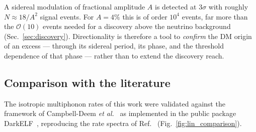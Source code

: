 A sidereal modulation of fractional amplitude $A$ is detected at $3\sigma$ with roughly
$N \approx 18/A^2$ signal events. For $A = 4\%$ this is of order $10^4$ events, far more
than the $\mathcal{O}(10)$ events needed for a discovery above the neutrino background
(Sec.~\ref{sec:discovery}). Directionality is therefore a tool to \emph{confirm} the DM
origin of an excess --- through its sidereal period, its phase, and the threshold
dependence of that phase --- rather than to extend the discovery reach.

\subsection{Comparison with the literature}

The isotropic multiphonon rates of this work were validated against the framework of
Campbell-Deem \emph{et al.}~\cite{CampbellDeem2022} as implemented in the public package
DarkELF~\cite{Knapen2022DarkELF}, reproducing the rate spectra of
Ref.~\cite{CampbellDeem2022} (Fig.~\ref{fig:lin_comparison}).

